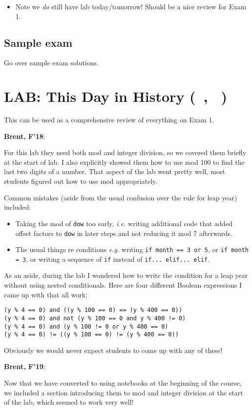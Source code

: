 \documentclass{article}
\newenvironment{reflect}[1]
{
  \noindent
  \begin{lrbox}{\reflectbox}
    \begin{minipage}[t]{\textwidth}
      \textbf{#1}:
}{
    \end{minipage}
  \end{lrbox}
  \fbox{\usebox{\reflectbox}}
}
\newcommand{\ready}{\textcolor{Green}{\Checkmark}\xspace}
\newcommand{\shortmonthname}{\StrLeft{\datemonthname}{3}}
\newcommand{\showdate}{\thedateday\ \shortmonthname}
\newcommand{\lab}[1]{\section*{LAB: #1 (\showdate\nextdate, \showdate)}}
\begin{document}
\begin{itemize}
\item Note we \emph{do} still have lab today/tomorrow!  Should be a
  nice review for Exam 1.
\end{itemize}

\subsection*{Sample exam}

Go over sample exam solutions.

\newpage
\lab{\ready This Day in History}

This can be used as a comprehensive review of everything on Exam 1.

\begin{reflect}{Brent, F'18}
  For this lab they need both mod and integer division, so we covered
  them briefly at the start of lab.  I also explicitly showed them how
  to use mod 100 to find the last two digits of a number.  That aspect
  of the lab went pretty well, most students figured out how to use
  mod appropriately.

  Common mistakes (aside from the usual confusion over the rule for
  leap year) included:
  \begin{itemize}
  \item Taking the mod of \verb|dow| too early, \emph{i.e.} writing
    additional code that added offset factors to \verb|dow| in later
    steps and not reducing it mod 7 afterwards.
  \item The usual things re conditions \emph{e.g.} writing \texttt{if month
    == 3 or 5}, or \texttt{if month = 3}, or writing a sequence of
    \verb|if| instead of \texttt{if... elif... elif}.
  \end{itemize}

  As an aside, during the lab I wondered how to write the condition
  for a leap year without using nested conditionals.  Here are four
  different Boolean expressions I came up with that all work:
\begin{verbatim}
(y % 4 == 0) and ((y % 100 == 0) == (y % 400 == 0))
(y % 4 == 0) and not (y % 100 == 0 and y % 400 != 0)
(y % 4 == 0) and (y % 100 != 0 or y % 400 == 0)
(y % 4 == 0) != ((y % 100 == 0) != (y % 400 == 0))
\end{verbatim}
  Obviously we would never expect students to come up with any of these!
\end{reflect}

\begin{reflect}{Brent, F'19}
  Now that we have converted to using notebooks at the beginning of
  the course, we included a section introducing them to mod and
  integer division at the start of the lab, which seemed to work very
  well!
\end{reflect}
\end{document}
